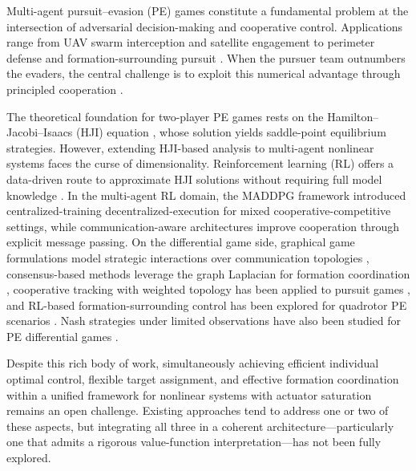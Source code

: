 \documentclass[conference]{IEEEtran}
\begin{document}
Multi-agent pursuit--evasion (PE) games constitute a fundamental problem at the intersection of adversarial decision-making and cooperative control. Applications range from UAV swarm interception \cite{b_zhang2023} and satellite engagement \cite{b_gong2020} to perimeter defense \cite{b_shishika2020} and formation-surrounding pursuit \cite{b_formrl2024}. When the pursuer team outnumbers the evaders, the central challenge is to exploit this numerical advantage through principled cooperation \cite{b_isaacs,b_chen2016}.

The theoretical foundation for two-player PE games rests on the Hamilton--Jacobi--Isaacs (HJI) equation \cite{b_isaacs}, whose solution yields saddle-point equilibrium strategies. However, extending HJI-based analysis to multi-agent nonlinear systems faces the curse of dimensionality. Reinforcement learning (RL) offers a data-driven route to approximate HJI solutions without requiring full model knowledge \cite{b_lewis1998,b_lopez2020,b_xu2024}. In the multi-agent RL domain, the MADDPG framework \cite{b_maddpg} introduced centralized-training decentralized-execution for mixed cooperative-competitive settings, while communication-aware architectures \cite{b_commrl2025} improve cooperation through explicit message passing. On the differential game side, graphical game formulations model strategic interactions over communication topologies \cite{b_lopez2020,b_graphgame2023}, consensus-based methods leverage the graph Laplacian for formation coordination \cite{b_ren2005,b_olfati2004}, cooperative tracking with weighted topology has been applied to pursuit games \cite{b_zhou2024}, and RL-based formation-surrounding control has been explored for quadrotor PE scenarios \cite{b_formrl2024}. Nash strategies under limited observations have also been studied for PE differential games \cite{b_graphswap}.

Despite this rich body of work, simultaneously achieving efficient individual optimal control, flexible target assignment, and effective formation coordination within a unified framework for nonlinear systems with actuator saturation remains an open challenge. Existing approaches tend to address one or two of these aspects, but integrating all three in a coherent architecture---particularly one that admits a rigorous value-function interpretation---has not been fully explored.
\end{document}

